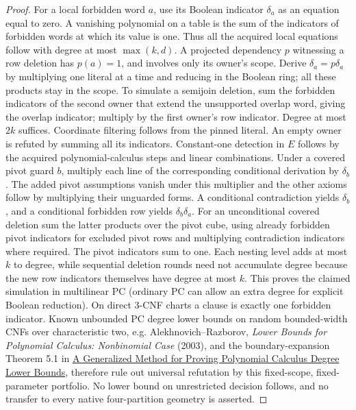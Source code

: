 \documentclass[11pt]{article}
\begin{document}
\begin{proof}
For a local forbidden word $a$, use its Boolean indicator $\delta_a$ as an equation equal to zero. A vanishing polynomial on a table is the sum of the indicators of forbidden words at which its value is one. Thus all the acquired local equations follow with degree at most $\max(k,d)$. A projected dependency $p$ witnessing a row deletion has $p(a)=1$, and involves only its owner's scope. Derive $\delta_a=p\delta_a$ by multiplying one literal at a time and reducing in the Boolean ring; all these products stay in the scope. To simulate a semijoin deletion, sum the forbidden indicators of the second owner that extend the unsupported overlap word, giving the overlap indicator; multiply by the first owner's row indicator. Degree at most $2k$ suffices. Coordinate filtering follows from the pinned literal. An empty owner is refuted by summing all its indicators. Constant-one detection in $E$ follows by the acquired polynomial-calculus steps and linear combinations.
Under a covered pivot guard $b$, multiply each line of the corresponding conditional derivation by $\delta_b$. The added pivot assumptions vanish under this multiplier and the other axioms follow by multiplying their unguarded forms. A conditional contradiction yields $\delta_b$, and a conditional forbidden row yields $\delta_b\delta_a$. For an unconditional covered deletion sum the latter products over the pivot cube, using already forbidden pivot indicators for excluded pivot rows and multiplying contradiction indicators where required. The pivot indicators sum to one. Each nesting level adds at most $k$ to degree, while sequential deletion rounds need not accumulate degree because the new row indicators themselves have degree at most $k$. This proves the claimed simulation in multilinear PC (ordinary PC can allow an extra degree for explicit Boolean reduction). On direct 3-CNF charts a clause is exactly one forbidden indicator. Known unbounded PC degree lower bounds on random bounded-width CNFs over characteristic two, e.g. Alekhnovich--Razborov, \emph{Lower Bounds for Polynomial Calculus: Nonbinomial Case} (2003), and the boundary-expansion Theorem 5.1 in \href{https://doi.org/10.1145/3675668}{A Generalized Method for Proving Polynomial Calculus Degree Lower Bounds}, therefore rule out universal refutation by this fixed-scope, fixed-parameter portfolio. No lower bound on unrestricted decision follows, and no transfer to every native four-partition geometry is asserted.
\end{proof}
\end{document}
